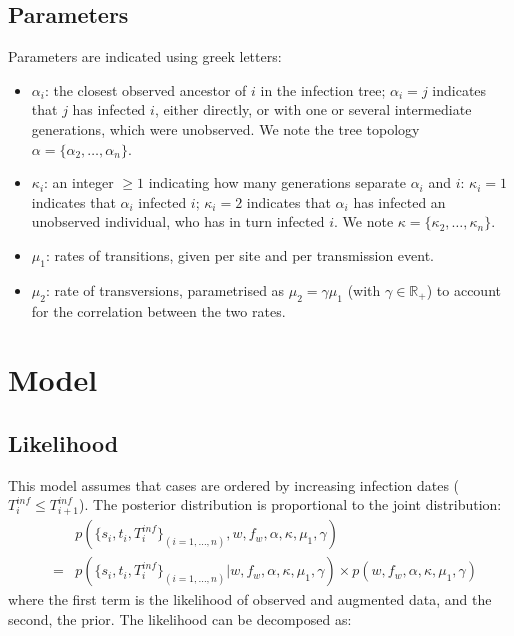 \documentclass[10pt]{article}
\begin{document}
\subsection*{Parameters}
Parameters are indicated using greek letters:
\begin{itemize}
         \item $\alpha_i$: the closest observed ancestor of $i$ in the infection tree; $\alpha_i=j$ indicates that $j$ has infected $i$, either directly, or with one or several intermediate generations, which were unobserved. 
We note the tree topology $\alpha = \{\alpha_2, \ldots, \alpha_n\}$.
 	\item $\kappa_i$: an integer $\geq 1$ indicating how many generations separate $\alpha_i$ and $i$: $\kappa_i=1$ indicates that $\alpha_i$ infected $i$; $\kappa_i=2$ indicates that $\alpha_i$ has infected an unobserved individual, who has in turn infected $i$.
We note $\kappa = \{\kappa_2, \ldots, \kappa_n\}$.

	\item $\mu_1$: rates of transitions, given per site and per transmission event.
	\item $\mu_2 $: rate of transversions, parametrised as $\mu_2 = \gamma \mu_1$ (with $\gamma \in \mathbb{R}_+$) to account for the correlation between the two rates.
\end{itemize}






\section*{Model}

\subsection*{Likelihood}

This model assumes that cases are ordered by increasing infection dates ($T_i^{inf} \leq T_{i+1}^{inf}$).
The posterior distribution is proportional to the joint distribution:
\begin{eqnarray}
& & p(\{s_i, t_i, T_i^{inf}\}_{(i=1,\ldots,n)}, w, f_w, \alpha, \kappa, \mu_1, \gamma)\\
& = & p(\{s_i, t_i, T_i^{inf}\}_{(i=1,\ldots,n)}| w, f_w, \alpha, \kappa, \mu_1, \gamma) \times p( w, f_w, \alpha, \kappa, \mu_1, \gamma)
\end{eqnarray}
where the first term is the likelihood of observed and augmented data, and the second, the prior.
The likelihood can be decomposed as:
\end{document}
